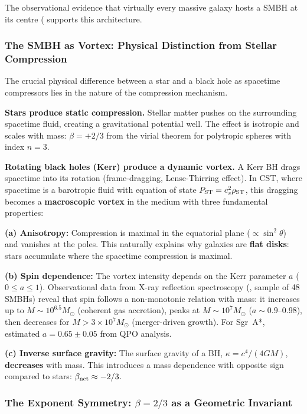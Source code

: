 \documentclass[10pt,a4paper]{article}
\begin{document}
The observational evidence that virtually every massive galaxy hosts a SMBH at its centre (\cite{Kormendy2013} supports this architecture.

\subsubsection{The SMBH as Vortex: Physical Distinction from Stellar Compression}

The crucial physical difference between a star and a black hole as spacetime compressors lies in the nature of the compression mechanism.

\textbf{Stars produce static compression.} Stellar matter pushes on the surrounding spacetime fluid, creating a gravitational potential well. The effect is isotropic and scales with mass: $\beta = +2/3$ from the virial theorem for polytropic spheres with index $n = 3$.

\textbf{Rotating black holes (Kerr) produce a dynamic vortex.} A Kerr BH drags spacetime into its rotation (frame-dragging, Lense-Thirring effect). In CST, where spacetime is a barotropic fluid with equation of state $P_{\rm ST} = c_s^2 \rho_{\rm ST}$, this dragging becomes a \textbf{macroscopic vortex} in the medium with three fundamental properties:

\textbf{(a) Anisotropy:} Compression is maximal in the equatorial plane ($\propto \sin^2\theta$) and vanishes at the poles. This naturally explains why galaxies are \textbf{flat disks}: stars accumulate where the spacetime compression is maximal.

\textbf{(b) Spin dependence:} The vortex intensity depends on the Kerr parameter $a$ ($0 \leq a \leq 1$). Observational data from X-ray reflection spectroscopy (\cite{Chen2025}, sample of 48 SMBHs) reveal that spin follows a non-monotonic relation with mass: it increases up to $M \sim 10^{6.5} M_\odot$ (coherent gas accretion), peaks at $M \sim 10^7 M_\odot$ ($a \sim 0.9$--0.98), then decreases for $M > 3 \times 10^7 M_\odot$ (merger-driven growth). For Sgr~A*, \cite{Dokuchaev2013} estimated $a = 0.65 \pm 0.05$ from QPO analysis.

\textbf{(c) Inverse surface gravity:} The surface gravity of a BH, $\kappa = c^4/(4GM)$, \textbf{decreases} with mass. This introduces a mass dependence with opposite sign compared to stars: $\beta_{\rm net} \approx -2/3$.

\subsubsection{The Exponent Symmetry: $\beta = 2/3$ as a Geometric Invariant}\label{sec:beta23}
\end{document}
